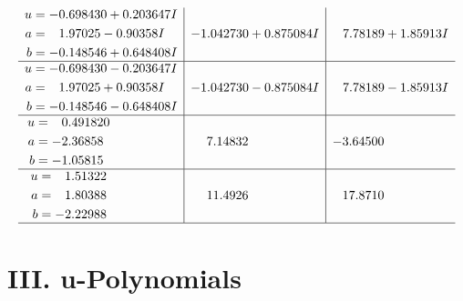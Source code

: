 \documentclass[1p]{elsarticle_modified}
\theoremstyle{definition}
\begin{document}
$$\begin{array}{c|c|c}
\begin{aligned}
u &= -0.698430 + 0.203647 I \\
a &= \phantom{-}1.97025 - 0.90358 I \\
b &= -0.148546 + 0.648408 I\end{aligned}
 & -1.042730 + 0.875084 I & \phantom{-}7.78189 + 1.85913 I \\ \hline\begin{aligned}
u &= -0.698430 - 0.203647 I \\
a &= \phantom{-}1.97025 + 0.90358 I \\
b &= -0.148546 - 0.648408 I\end{aligned}
 & -1.042730 - 0.875084 I & \phantom{-}7.78189 - 1.85913 I \\ \hline\begin{aligned}
u &= \phantom{-}0.491820\phantom{ +0.000000I} \\
a &= -2.36858\phantom{ +0.000000I} \\
b &= -1.05815\phantom{ +0.000000I}\end{aligned}
 & \phantom{-}7.14832\phantom{ +0.000000I} & -3.64500\phantom{ +0.000000I} \\ \hline\begin{aligned}
u &= \phantom{-}1.51322\phantom{ +0.000000I} \\
a &= \phantom{-}1.80388\phantom{ +0.000000I} \\
b &= -2.22988\phantom{ +0.000000I}\end{aligned}
 & \phantom{-}11.4926\phantom{ +0.000000I} & \phantom{-}17.8710\phantom{ +0.000000I}\\
 \hline 
 \end{array}$$\newpage
\newpage\renewcommand{\arraystretch}{1}
\centering \section*{ III. u-Polynomials}
\end{document}
